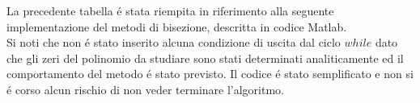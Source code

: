 \noindent La precedente tabella \'e stata riempita in riferimento alla seguente implementazione del metodi di bisezione, descritta in codice Matlab.\\



\noindent Si noti che non \'e stato inserito alcuna condizione di uscita dal ciclo \(while\) dato che gli zeri del polinomio da studiare sono stati determinati analiticamente ed il comportamento del metodo \'e stato previsto. Il codice \'e stato semplificato e non si \'e corso alcun rischio di non veder terminare l'algoritmo.
